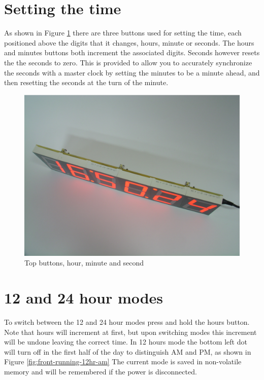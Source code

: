 \documentclass{article}
\begin{document}
\section{Setting the time}

As shown in Figure \ref{fig:top-buttons} there are three buttons used for
setting the time, each positioned above the digits that it changes, hours,
minute or seconds. The hours and minutes buttons both increment the associated
digits. Seconds however resets the the seconds to zero. This is provided to
allow you to accurately synchronize the seconds with a master clock by setting
the minutes to be a minute ahead, and then resetting the seconds at the turn of
the minute.

\begin{figure}
\centering
\includegraphics[width=4.75in]{figures/top-buttons.eps}
\caption{Top buttons, hour, minute and second}
\label{fig:top-buttons}
\end{figure}

\pagebreak

\section{12 and 24 hour modes}

To switch between the 12 and 24 hour modes press and hold the hours button.
Note that hours will increment at first, but upon switching modes this
increment will be undone leaving the correct time. In 12 hours mode the bottom
left dot will turn off in the first half of the day to distinguish AM and PM,
as shown in Figure \ref{fig:front-running-12hr-am} The current mode is saved in
non-volatile memory and will be remembered if the power is disconnected.
\end{document}

